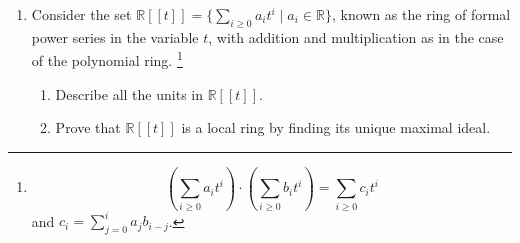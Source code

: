 \documentclass[12pt]{article}
\newcommand{\bbR}{\mathbb{R}}
\begin{document}
\begin{enumerate}
\item Consider the set $\bbR[[t]]=\{\sum\limits_{i\geq 0} a_i t^i\mid
  a_i \in \bbR\}$, known as the ring of formal power series in the
  variable $t$, with addition and multiplication as in the case of the
  polynomial ring. \footnote{\[\left(\sum\limits_{i\geq 0} a_i
      t^i\right) \cdot \left(\sum\limits_{i\geq 0} b_i t^i \right) =
    \sum\limits_{i\geq 0} c_i t^i\] and $c_i = \sum\limits_{j=0}^i a_jb_{i-j}$.}
  \begin{enumerate}
  \item Describe all the units in $\bbR[[t]]$. 
  \item Prove that $\bbR[[t]]$ is a local ring by finding its unique
    maximal ideal.
  \end{enumerate}

\end{enumerate}
\end{document}
